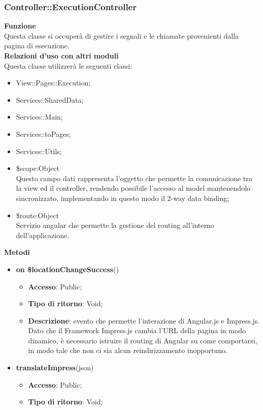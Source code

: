 {	\subsubsection{Controller::\-ExecutionController}{
		\textbf{Funzione}\\
		\indent Questa classe si occuperà di gestire i segnali e le chiamate provenienti dalla pagina di esecuzione.\\
		\textbf{Relazioni d'uso con altri moduli}\\
		\indent Questa classe utilizzerà le seguenti classi:
		\begin{itemize}
			\item View::\-Pages::\-Execution;
			\item Services::\-SharedData;
			\item Services::\-Main;
			\item Services::\-toPages;
			\item Services::\-Utils;
			\item \$scope:Object\\
				\indent Questo campo dati rappresenta l’oggetto che permette la comunicazione tra la view ed il controller, rendendo possibile l’accesso al model mantenendolo sincronizzato, implementando in questo modo il 2-way data binding;
			\item \$route:Object\\
				\indent Servizio angular che permette la gestione del routing all'interno dell'applicazione.
		\end{itemize}
		\textbf{Metodi}
		\begin{itemize}
			\item \textbf{on \$locationChangeSuccess}()
			\begin{itemize}
				\item \textbf{Accesso}: Public;
				\item \textbf{Tipo di ritorno}: Void;
				\item \textbf{Descrizione}: evento che permette l'interazione di Angular.js e Impress.js. Dato che il Framework Impress.js cambia l'URL della pagina in modo dinamico, è necessario istruire il routing di Angular su come comportarsi, in modo tale che non ci sia alcun reindirizzamento inopportuno.
			\end{itemize}
			\item \textbf{translateImpress}(json)
			\begin{itemize}
				\item \textbf{Accesso}: Public;
				\item \textbf{Tipo di ritorno}: Void;

\end{itemize}
\end{itemize}}}
